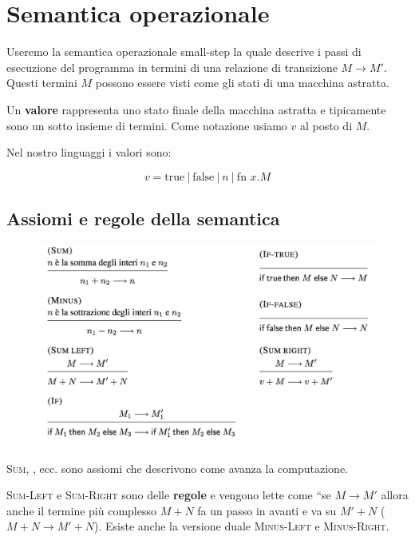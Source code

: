 

\section{Semantica operazionale}

Useremo la semantica operazionale small-step la quale descrive i passi di esecuzione del programma in termini di una relazione di transizione $M \rightarrow M'$.
Questi termini $M$ possono essere visti come gli stati di una macchina astratta.

Un \textbf{valore} rappresenta uno stato finale della macchina astratta e tipicamente sono un sotto insieme di termini. Come notazione usiamo $v$ al posto di $M$.

Nel nostro linguaggi i valori sono:

$$
v = \text{true} \: | \: \text{false} \:|\: n \: | \: \text{fn }x.M
$$

\subsection{Assiomi e regole della semantica}

\begin{figure}[htpb]
	\centering
	\includegraphics[width = 0.7\linewidth]{./images/l3-assiomi}
\end{figure}

\textsc{Sum}, , ecc. sono assiomi che descrivono come avanza la computazione.

\textsc{Sum-Left} e \textsc{Sum-Right} sono delle \textbf{regole} e vengono lette come ``se $M \rightarrow M'$ allora anche il termine più complesso $M + N$ fa un passo in avanti e va su $M' + N$ ($M + N \rightarrow M' +N$). Esiste anche la versione duale \textsc{Minus-Left} e \textsc{Minus-Right}.

